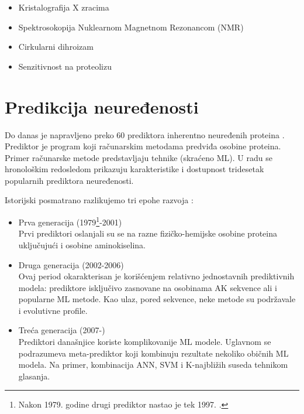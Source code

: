 \begin{itemize}
  \item Kristalografija X zracima  
  \item Spektrosokopija Nuklearnom Magnetnom Rezonancom (NMR) 
  \item Cirkularni dihroizam 
  \item Senzitivnost na proteolizu 
\end{itemize}


\section{Predikcija neuređenosti}

Do danas je napravljeno preko 60 prediktora inherentno neuređenih proteina
\parencite{Meng2017}. Prediktor je program koji 
računarskim metodama predviđa osobine proteina. Primer računarske metode
predstavljaju tehnike  (skraćeno ML).  U radu
\parencite{Meng_c2017} se hronološkim redosledom prikazuju karakteristike i
dostupnost tridesetak popularnih prediktora neuređenosti.


Istorijski posmatrano razlikujemo tri epohe razvoja \parencite{Meng_c2017}:
\begin{itemize}
  \item Prva generacija (1979\footnote{
      Nakon 1979. godine drugi prediktor nastao je tek 1997.
      \parencite{Meng_c2017}.}-2001)\\
    Prvi prediktori oslanjali su se na razne fizičko-hemijske osobine proteina
    uključujući i osobine aminokiselina. 

  \item Druga generacija (2002-2006)\\
    Ovaj period okarakterisan je korišćenjem relativno jednostavnih
    prediktivnih modela: prediktore isključivo zasnovane na osobinama AK
    sekvence ali i popularne ML metode. Kao ulaz, pored sekvence, neke metode su
    podržavale i evolutivne profile.

  \item Treća generacija (2007-)\\
    Prediktori današnjice koriste komplikovanije ML modele. Uglavnom  se
    podrazumeva meta-prediktor koji kombinuju rezultate nekoliko običnih ML
    modela. Na primer, kombinacija ANN, SVM i K-najbližih suseda tehnikom
    glasanja.

\end{itemize}


